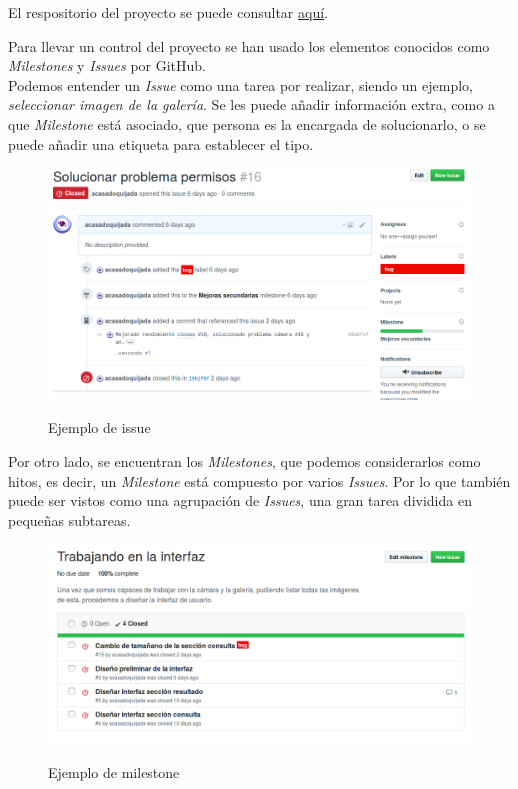 El respositorio del proyecto se puede consultar \href{https://github.com/acasadoquijada/jmr-android}{aquí}.

Para llevar un control del proyecto se han usado los elementos conocidos como \textit{Milestones} y \textit{Issues} por GitHub.\\

Podemos entender un \textit{Issue} como una tarea por realizar, siendo un ejemplo, \textit{seleccionar imagen de la galería}. Se les puede añadir información extra, como a que \textit{Milestone} está asociado, que persona es la encargada de solucionarlo, o se puede añadir una etiqueta para establecer el tipo.\\

\begin{figure}[H] %
\centering
\includegraphics[scale=0.4]{imagenes/issue.png}  %
\label{issue.png}
\caption{Ejemplo de issue}
\end{figure}

Por otro lado, se encuentran los \textit{Milestones}, que podemos considerarlos como hitos, es decir, un \textit{Milestone} está compuesto por varios \textit{Issues}. Por lo que también puede ser vistos como una agrupación de \textit{Issues}, una gran tarea dividida en pequeñas subtareas.\\

\begin{figure}[H] %
\centering
\includegraphics[scale=0.4]{imagenes/milestone.png}  %
\label{milestone.png}
\caption{Ejemplo de milestone}
\end{figure}

